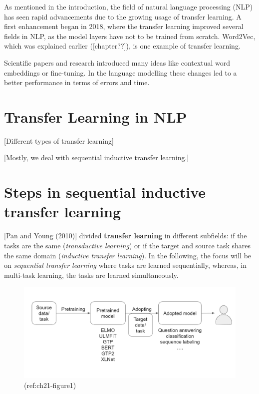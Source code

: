 \documentclass[]{krantz}
\begin{document}
As mentioned in the introduction, the field of natural language processing (NLP) has seen rapid advancements due to the growing usage of transfer learning.
A first enhancement began in 2018, where the transfer learning improved several fields in NLP, as the model layers have not to be trained from scratch. Word2Vec, which was explained earlier ({[}chapter??{]}), is one example of transfer learning.

Scientific papers and research introduced many ideas like contextual word embeddings or fine-tuning. In the language modelling these changes led to a better performance in terms of errors and time.

\hypertarget{transfer-learning-in-nlp}{%
\section{Transfer Learning in NLP}\label{transfer-learning-in-nlp}}

{[}Different types of transfer learning{]}

{[}Mostly, we deal with sequential inductive transfer learning.{]}

\hypertarget{steps-in-sequential-inductive-transfer-learning}{%
\section{Steps in sequential inductive transfer learning}\label{steps-in-sequential-inductive-transfer-learning}}

{[}Pan and Young (2010){]} divided \textbf{transfer learning} in different subfields: if the tasks are the same (\emph{transductive learning}) or if the target and source task shares the same domain (\emph{inductive transfer learning}). In the following, the focus will be on \emph{sequential transfer learning} where tasks are learned sequentially, whereas, in multi-task learning, the tasks are learned simultaneously.

\begin{figure}

{\centering \includegraphics[width=0.8\linewidth]{figures/02-01-transfer-learning-for-nlp-1/sequential-transfer-learning} 

}

\caption{(ref:ch21-figure1)}\label{fig:ch21-figure01}
\end{figure}
\end{document}

